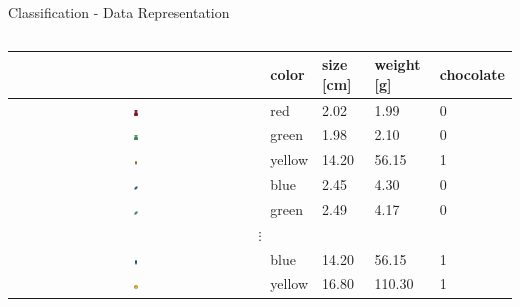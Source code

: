 \documentclass[aspectratio=169]{beamer}
\begin{document}
\begin{frame}{Classification - Data Representation}
    \scriptsize
    \begin{columns}
        \begin{column}{0.8\textwidth}
            \centering
            \begin{tabularx}{0.8\textwidth}{@{}c|Y|Y|Y|Y@{}}
                \toprule
                    & \textbf{color} & \textbf{size [cm]} & \textbf{weight [g]} & \textbf{chocolate}  \\
                \midrule
                \parbox[c]{1em}{\includegraphics[width=0.0175\textwidth]{figures/023-gummy-bear-0.pdf}} & red & 2.02 & 1.99 & 0   \\
                \midrule
                 \parbox[c]{1em}{\includegraphics[width=0.0175\textwidth]{figures/023-gummy-bear-1.pdf}} & green & 1.98  & 2.10 & 0   \\
                \midrule
                \parbox[c]{1em}{\includegraphics[width=0.0175\textwidth]{figures/028-ice-cream-2.pdf}} & yellow & 14.20  & 56.15 & 1  \\
                \midrule
                \parbox[c]{1em}{\includegraphics[width=0.0175\textwidth]{figures/041-candy-3.pdf}} & blue & 2.45  & 4.30 & 0   \\
                \midrule
                \parbox[c]{1em}{\includegraphics[width=0.0175\textwidth]{figures/041-candy-1.pdf}} & green & 2.49  & 4.17 & 0  \\
                \midrule
                  \\
                \midrule
                \parbox[c]{1em}{\includegraphics[width=0.0175\textwidth]{figures/028-ice-cream-3.pdf}} & blue & 14.20  & 56.15 & 1 \\
                \midrule
                \parbox[c]{1em}{\includegraphics[width=0.0175\textwidth]{figures/046-donuts-2.pdf}} & yellow & 16.80  & 110.30 & 1  \\

\end{tabularx}
\end{column}
\end{columns}
\end{frame}
\end{document}
